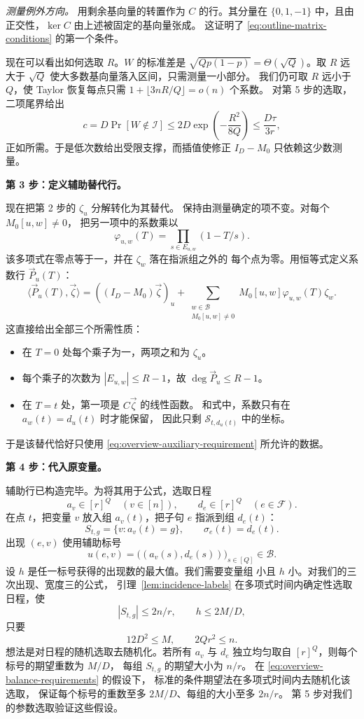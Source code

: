 \documentclass[11pt,reqno]{amsart}
\numberwithin{equation}{section}
\theoremstyle{definition}\newtheorem{definition}[theorem]{定义}
\theoremstyle{remark}\newtheorem{remark}[theorem]{注}
\renewcommand{\le}{\leqslant}
\begin{document}
\smallskip\noindent
\emph{测量例外方向。}
用剩余基向量的转置作为 $C$ 的行。其分量在 $\{0,1,-1\}$
中，且由正交性，$\ker C$ 由上述被固定的基向量张成。
这证明了 \eqref{eq:outline-matrix-conditions} 的第一个条件。

现在可以看出如何选取 $R$。$W$ 的标准差是
$\sqrt{Qp(1-p)}=\Theta(\sqrt Q)$。取 $R$ 远大于 $\sqrt Q$
使大多数基向量落入区间，只需测量一小部分。
我们仍可取 $R$ 远小于 $Q$，使 Taylor 恢复每点只需
$1+\lfloor 3nR/Q\rfloor=o(n)$ 个系数。
对第 5 步的选取，二项尾界给出
\[
 c=D\Pr[W\notin\mathcal I]
      \le 2D\exp\!\left(-\frac{R^2}{8Q}\right)
      \le\frac{D\tau}{3r},
\]
正如所需。于是低次数给出受限支撑，而插值使修正
$I_D-M_0$ 只依赖这少数测量。

\medskip\noindent
\textbf{第 3 步：定义辅助替代行。}\par\nobreak
\smallskip\noindent
现在把第 2 步的 $\zeta_u$ 分解转化为其替代。
保持由测量确定的项不变。对每个 $M_0[u,w]\ne0$，
把另一项中的系数乘以
\[
 \varphi_{u,w}(T)=\prod_{s\in E_{u,w}}(1-T/s).
\]
该多项式在零点等于一，并在 $\zeta_w$ 落在指派组之外的
每个点为零。用恒等式定义系数行 $\vec P_u(T)$：
\begin{equation}\label{eq:outline-auxiliary-row}
 \langle\vec P_u(T),\vec\zeta\rangle
 =((I_D-M_0)\vec\zeta)_u+
   \sum_{\substack{w\in\mathcal B\\M_0[u,w]\ne0}}
                M_0[u,w]\varphi_{u,w}(T)\zeta_w.
\end{equation}
这直接给出全部三个所需性质：
\begin{itemize}
\item 在 $T=0$ 处每个乘子为一，两项之和为 $\zeta_u$。
\item 每个乘子的次数为 $|E_{u,w}|\le R-1$，故
$\deg\vec P_u\le R-1$。
\item 在 $T=t$ 处，第一项是 $C\vec\zeta$ 的线性函数。
和式中，系数只有在 $a_w(t)=d_u(t)$ 时才能保留，
因此只剩 $\mathcal S_{t,d_u(t)}$ 中的坐标。
\end{itemize}
于是该替代恰好只使用
\eqref{eq:overview-auxiliary-requirement} 所允许的数据。

\medskip\noindent
\textbf{第 4 步：代入原变量。}\par\nobreak
\smallskip\noindent
辅助行已构造完毕。为将其用于公式，选取日程
\[
 a_v\in[r]^Q\quad(v\in[n]),\qquad
 d_e\in[r]^Q\quad(e\in\mathcal F).
\]
在点 $t$，把变量 $v$ 放入组 $a_v(t)$，把子句 $e$
指派到组 $d_e(t)$：
\[
 S_{t,g}=\{v:a_v(t)=g\},\qquad \sigma_e(t)=d_e(t).
\]
出现 $(e,v)$ 使用辅助标号
\[
 u(e,v)=\bigl((a_v(s),d_e(s))\bigr)_{s\in[Q]}\in\mathcal B.
\]
设 $h$ 是任一标号获得的出现数的最大值。我们需要变量组
小且 $h$ 小。对我们的三次出现、宽度三的公式，
引理~\ref{lem:incidence-labels} 在多项式时间内确定性选取
日程，使
\[
 |S_{t,g}|\le2n/r,\qquad h\le2M/D,
\]
只要
\begin{equation}\label{eq:overview-balance-requirements}
 12D^2\le M,\qquad 2Qr^2\le n.
\end{equation}
想法是对日程的随机选取去随机化。若所有 $a_v$ 与 $d_e$
独立均匀取自 $[r]^Q$，则每个标号的期望重数为 $M/D$，
每组 $S_{t,g}$ 的期望大小为 $n/r$。
在 \eqref{eq:overview-balance-requirements} 的假设下，
标准的条件期望法在多项式时间内去随机化该选取，
保证每个标号的重数至多 $2M/D$、每组的大小至多 $2n/r$。
第 5 步对我们的参数选取验证这些假设。
\end{document}

